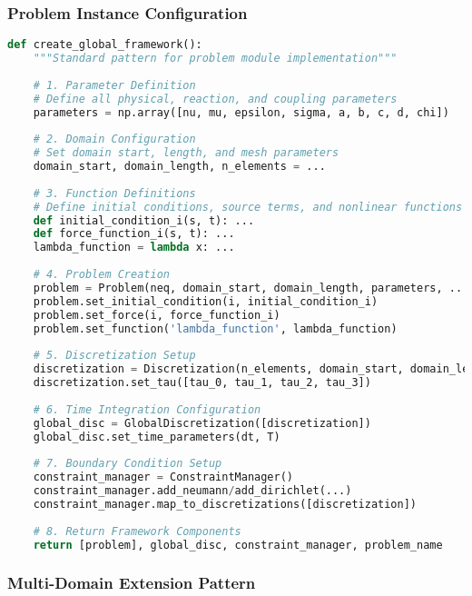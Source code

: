 \subsubsection{Problem Instance Configuration}

\begin{lstlisting}[language=Python, caption=Standard Problem Configuration Pattern]
def create_global_framework():
    """Standard pattern for problem module implementation"""
    
    # 1. Parameter Definition
    # Define all physical, reaction, and coupling parameters
    parameters = np.array([nu, mu, epsilon, sigma, a, b, c, d, chi])
    
    # 2. Domain Configuration  
    # Set domain start, length, and mesh parameters
    domain_start, domain_length, n_elements = ...
    
    # 3. Function Definitions
    # Define initial conditions, source terms, and nonlinear functions
    def initial_condition_i(s, t): ...
    def force_function_i(s, t): ...
    lambda_function = lambda x: ...
    
    # 4. Problem Creation
    problem = Problem(neq, domain_start, domain_length, parameters, ...)
    problem.set_initial_condition(i, initial_condition_i)
    problem.set_force(i, force_function_i)
    problem.set_function('lambda_function', lambda_function)
    
    # 5. Discretization Setup
    discretization = Discretization(n_elements, domain_start, domain_length, ...)
    discretization.set_tau([tau_0, tau_1, tau_2, tau_3])
    
    # 6. Time Integration Configuration
    global_disc = GlobalDiscretization([discretization])
    global_disc.set_time_parameters(dt, T)
    
    # 7. Boundary Condition Setup
    constraint_manager = ConstraintManager()
    constraint_manager.add_neumann/add_dirichlet(...)
    constraint_manager.map_to_discretizations([discretization])
    
    # 8. Return Framework Components
    return [problem], global_disc, constraint_manager, problem_name
\end{lstlisting}

\subsubsection{Multi-Domain Extension Pattern}

